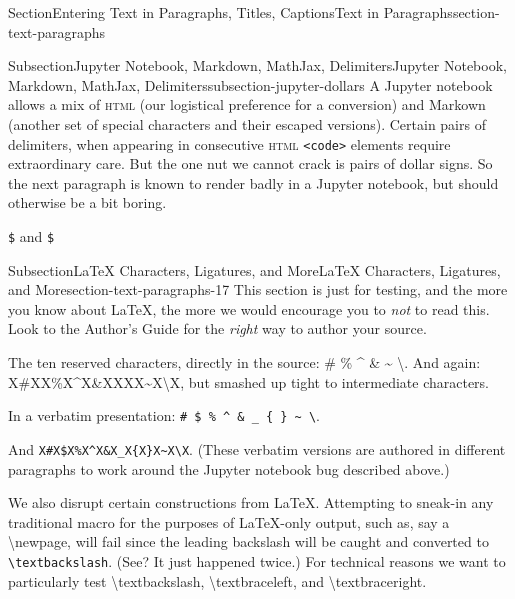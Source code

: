 \documentclass[twoside,10pt,]{article}
\newcommand{\mono}[1]{\texttt{#1}}
\newcommand{\initialism}[1]{\textsc{\MakeLowercase{#1}}}
\numberwithin{equation}{section}
\begin{document}
\begin{sectionptx}{Section}{Entering Text in Paragraphs, Titles, Captions}{}{Text in Paragraphs}{}{}{section-text-paragraphs}
%
%
\typeout{************************************************}
\typeout{************************************************}
%
\begin{subsectionptx}{Subsection}{Jupyter Notebook, Markdown, MathJax, Delimiters}{}{Jupyter Notebook, Markdown, MathJax, Delimiters}{}{}{subsection-jupyter-dollars}
A Jupyter notebook allows a mix of \initialism{HTML} (our logistical preference for a conversion) and Markown (another set of special characters and their escaped versions).  Certain pairs of delimiters, when appearing in consecutive \initialism{HTML} \mono{<code>} elements require extraordinary care.  But the one nut we cannot crack is pairs of dollar signs.  So the next paragraph is known to render badly in a Jupyter notebook, but should otherwise be a bit boring.%
\par
\mono{\$} and \mono{\$}%
\end{subsectionptx}
%
%
\typeout{************************************************}
\typeout{************************************************}
%
\begin{subsectionptx}{Subsection}{\LaTeX{} Characters, Ligatures, and More}{}{\LaTeX{} Characters, Ligatures, and More}{}{}{section-text-paragraphs-17}
This section is just for testing, and the more you know about \LaTeX{}, the more we would encourage you to \emph{not} to read this.  Look to the Author's Guide for the \emph{right} way to author your source.%
\par
The ten reserved characters, directly in the source: \# \textdollar{} \% \textasciicircum{} \& \textunderscore{} \textbraceleft{} \textbraceright{} \textasciitilde{} \textbackslash{}.  And again: X\#X\textdollar{}X\%X\textasciicircum{}X\&X\textunderscore{}X\textbraceleft{}X\textbraceright{}X\textasciitilde{}X\textbackslash{}X, but smashed up tight to intermediate characters.%
\par
In a verbatim presentation: \mono{\# \$ \% \textasciicircum{} \& \_ \{ \} \textasciitilde{} \textbackslash{}}.%
\par
And \mono{X\#X\$X\%X\textasciicircum{}X\&X\_X\{X\}X\textasciitilde{}X\textbackslash{}X}.  (These verbatim versions are authored in different paragraphs to work around the Jupyter notebook bug described above.)%
\par
We also disrupt certain constructions from \LaTeX{}.  Attempting to sneak-in any traditional macro for the purposes of \LaTeX{}-only output, such as, say a \textbackslash{}newpage, will fail since the leading backslash will be caught and converted to \mono{\textbackslash{}textbackslash}.  (See?  It just happened twice.)  For technical reasons we want to particularly test \textbackslash{}textbackslash, \textbackslash{}textbraceleft, and \textbackslash{}textbraceright.%

\end{subsectionptx}
\end{sectionptx}
\end{document}
